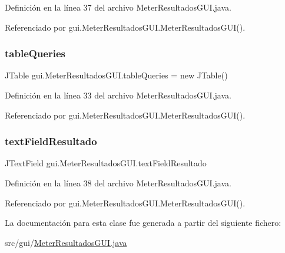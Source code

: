 Definición en la línea 37 del archivo Meter\+Resultados\+G\+U\+I.\+java.



Referenciado por gui.\+Meter\+Resultados\+G\+U\+I.\+Meter\+Resultados\+G\+U\+I().

\mbox{\label{classgui_1_1MeterResultadosGUI_a21b8ddf3a50cf3fb49737078ff9fe7ba}} 
\subsubsection{\texorpdfstring{tableQueries}{tableQueries}}
{\footnotesize\ttfamily J\+Table gui.\+Meter\+Resultados\+G\+U\+I.\+table\+Queries = new J\+Table()\hspace{0.3cm}{\ttfamily [private]}}



Definición en la línea 33 del archivo Meter\+Resultados\+G\+U\+I.\+java.



Referenciado por gui.\+Meter\+Resultados\+G\+U\+I.\+Meter\+Resultados\+G\+U\+I().

\mbox{\label{classgui_1_1MeterResultadosGUI_a3ac9b2987e549c1ba2fd7b26b257ff57}} 
\subsubsection{\texorpdfstring{textFieldResultado}{textFieldResultado}}
{\footnotesize\ttfamily J\+Text\+Field gui.\+Meter\+Resultados\+G\+U\+I.\+text\+Field\+Resultado\hspace{0.3cm}{\ttfamily [private]}}



Definición en la línea 38 del archivo Meter\+Resultados\+G\+U\+I.\+java.



Referenciado por gui.\+Meter\+Resultados\+G\+U\+I.\+Meter\+Resultados\+G\+U\+I().



La documentación para esta clase fue generada a partir del siguiente fichero\+:\begin{DoxyCompactItemize}
\item 
src/gui/\mbox{\hyperlink{MeterResultadosGUI_8java}{Meter\+Resultados\+G\+U\+I.\+java}}\end{DoxyCompactItemize}
